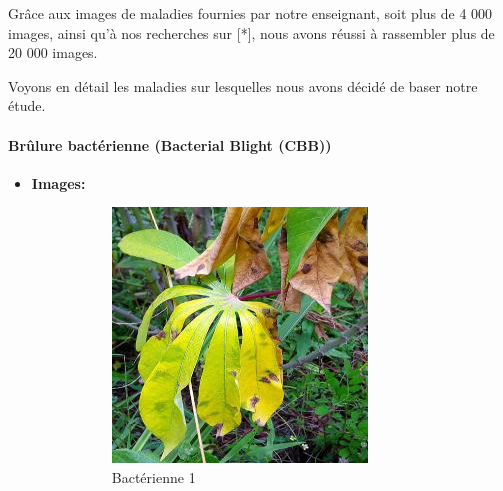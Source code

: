 Grâce aux images de maladies fournies par notre enseignant, soit plus de 4 000 images,
ainsi qu'à nos recherches sur [*], nous avons réussi à rassembler plus de 20 000 images.

Voyons en détail les maladies sur lesquelles nous avons décidé de baser notre étude.

\paragraph{Brûlure bactérienne (Bacterial Blight (CBB))}
\begin{itemize}
	\item \textbf{Images: }
	\begin{figure}[htbp]
		\centering
		\begin{subfigure}[b]{0.3\textwidth}
			\centering
			\includegraphics[width=\textwidth]{images/1.jpg}
			\caption{Bactérienne 1}
		\end{subfigure}
		\hfill
		\begin{subfigure}[b]{0.3\textwidth}
			\centering

\end{subfigure}
\end{figure}
\end{itemize}

